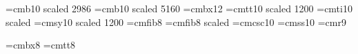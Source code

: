



\font\TitleFont=cmb10 scaled 2986   %
\def\TitleFonts{\TitleFont}         %
\font\NumFont=cmb10 scaled 5160     %
\font\SubTitleFont=cmbx12           %
\font\SubTitlett=cmtt10 scaled 1200 %
\def\SubTitleFonts{\SubTitleFont}   %
\font\SubSectionTitleFont=cmti10 scaled\magstephalf %
\font\Bigsy=cmsy10 scaled 1200      %
\font\SmallPnoFont=cmfib8           %
\font\PnoFont=cmfib8 scaled   %
\font\Smallcaps=cmcsc10             %
\let\sc=\Smallcaps \let\smc=\Smallcaps %
\font\Sansserif=cmss10              %
\let\sf=\Sansserif                  %
\font\Ninerm=cmr9   
\let\Smallrm=\Ninerm    %

\font\Eightbf=cmbx8  
\font\Eighttt=cmtt8
\let\MarginFont\Eightbf 

\def\UseBigCal{\font\TitleCal=cmbsy10 scaled2986
                \def\TitleFonts{\textfont2=\TitleCal 
                    \exhyphenpenalty10000 \pretolerance10000 
                    \hbadness10000 \TitleFont}}
\def\Trick#1{{\Ninebf\uppercase{#1}}} %
\def\UseMedCal{\font\SubTitleCalFont=cmbsy10 scaled\magstep1
               \font\SmSubTitleCalFont=cmbsy9
               \font\Tenbsy=cmbsy10 
               \font\Ninebf=cmbx9
                \def\SubTitleFonts{\textfont2=\SubTitleCalFont
                    \scriptfont2=\SmSubTitleCalFont
                  \let\Eightsy\Tenbsy \let\Smallcaps\Trick 
                  \SubTitleFont}}


